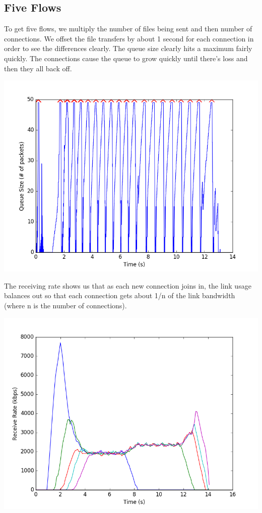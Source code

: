 \documentclass[11pt]{article}
\begin{document}
\subsection{Five Flows}

To get five flows, we multiply the number of files being sent and then number of connections. We offset the file transfers by about 1 second for each connection in order to see the differences clearly. The queue size clearly hits a maximum fairly quickly. The connections cause the queue to grow quickly until there's loss and then they all back off.

\vspace{5mm}

\includegraphics[width=17cm]{charts/five/queueSize.png}

\vspace{5mm}

The receiving rate shows us that as each new connection joins in, the link usage balances out so that each connection gets about 1/n of the link bandwidth (where n is the number of connections).

\vspace{5mm}

\includegraphics[width=17cm]{charts/five/rateTime5.png}
\end{document}
